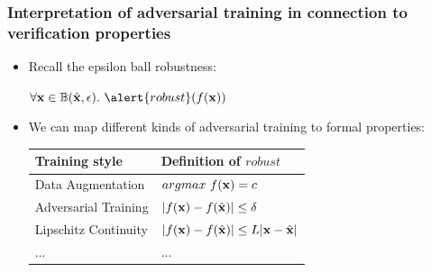 \documentclass[aspectratio=169]{beamer}
\begin{document}
\begin{frame}
  \frametitle{Interpretation of adversarial training in connection to verification properties}

  
    \begin{itemize}[<+-|alert@+>]
      \item Recall the epsilon ball robustness:
      
       $\forall \x \in \mathbb{B}(\hat{\x}, \epsilon). \ \alert{robust}(f(\x)) $

        \item We can map different kinds of adversarial training to formal properties:
          	\begin{tabular}{p{3.5cm}|p{5.5cm}} 
		Training style & Definition of \textbf{$robust$}  \\ \hline \hline
		Data Augmentation & 	$ argmax\ f(\mathbf{x}) = c$  \\ \hline
		Adversarial Training & 	$ |f(\mathbf{x}) - f(\hat{\mathbf{x}})| \leq \delta$ \\ \hline
          Lipschitz Continuity & 	$ |f(\mathbf{x}) - f(\hat{\mathbf{x}})| \leq L|\mathbf{x}-\hat{\mathbf{x}}|$  \\ \hline
          ... & ... \\
	\end{tabular}
        \end{itemize}
        
        
       {\scriptsize
 \begin{thebibliography}{99}
   \beamertemplatearticlebibitems
\end{thebibliography}}
 
    
  \end{frame}
\end{document}
